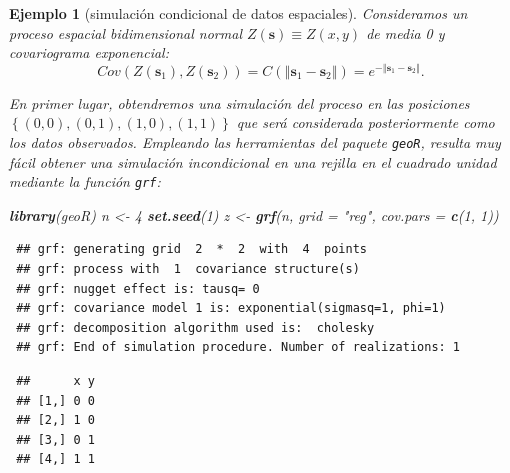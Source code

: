\documentclass[
  spanish,
  10pt,
]{book}
\newenvironment{Shaded}{\begin{snugshade}}{\end{snugshade}}
\newcommand{\AttributeTok}[1]{\textcolor[rgb]{0.13,0.29,0.53}{#1}}
\newcommand{\CommentTok}[1]{\textcolor[rgb]{0.56,0.35,0.01}{\textit{#1}}}
\newcommand{\DecValTok}[1]{\textcolor[rgb]{0.00,0.00,0.81}{#1}}
\newcommand{\FunctionTok}[1]{\textcolor[rgb]{0.13,0.29,0.53}{\textbf{#1}}}
\newcommand{\NormalTok}[1]{#1}
\newcommand{\OtherTok}[1]{\textcolor[rgb]{0.56,0.35,0.01}{#1}}
\newcommand{\SpecialCharTok}[1]{\textcolor[rgb]{0.81,0.36,0.00}{\textbf{#1}}}
\newcommand{\StringTok}[1]{\textcolor[rgb]{0.31,0.60,0.02}{#1}}
\renewcommand{\mathbf}[1]{\symbf{#1}}
\theoremstyle{break}
\newtheorem{example}{Ejemplo}[chapter]
\theoremstyle{nonumberplain}
\renewcommand{\CommentTok}[1]{\textcolor[rgb]{0.41,0.41,0.41}{\texttt{#1}}}
\begin{document}
\begin{example}[simulación condicional de datos espaciales]

Consideramos un proceso espacial bidimensional normal
\(Z(\mathbf{s})\equiv Z(x,y)\) de media 0 y covariograma
exponencial:
\[Cov(Z(\mathbf{s}_1),Z(\mathbf{s}_2)) 
= C(\left\Vert \mathbf{s}_1-\mathbf{s}_2\right\Vert )
= e^{-\left\Vert \mathbf{s}_1-\mathbf{s}_2\right\Vert }.\]

En primer lugar, obtendremos una simulación del proceso en las posiciones
\(\left\{(0,0),(0,1),(1,0),(1,1)\right\}\) que será considerada posteriormente
como los datos observados.
Empleando las herramientas del paquete \texttt{geoR}, resulta muy fácil obtener
una simulación incondicional en una rejilla en el cuadrado unidad
mediante la función \texttt{grf}:

\begin{Shaded}
\begin{Highlighting}[]
\FunctionTok{library}\NormalTok{(geoR)}
\NormalTok{n }\OtherTok{\textless{}{-}} \DecValTok{4}
\FunctionTok{set.seed}\NormalTok{(}\DecValTok{1}\NormalTok{)}
\NormalTok{z }\OtherTok{\textless{}{-}} \FunctionTok{grf}\NormalTok{(n, }\AttributeTok{grid =} \StringTok{"reg"}\NormalTok{, }\AttributeTok{cov.pars =} \FunctionTok{c}\NormalTok{(}\DecValTok{1}\NormalTok{, }\DecValTok{1}\NormalTok{))}
\end{Highlighting}
\end{Shaded}

\begin{verbatim}
 ## grf: generating grid  2  *  2  with  4  points
 ## grf: process with  1  covariance structure(s)
 ## grf: nugget effect is: tausq= 0 
 ## grf: covariance model 1 is: exponential(sigmasq=1, phi=1)
 ## grf: decomposition algorithm used is:  cholesky 
 ## grf: End of simulation procedure. Number of realizations: 1
\end{verbatim}

\begin{Shaded}
\end{Shaded}

\begin{verbatim}
 ##      x y
 ## [1,] 0 0
 ## [2,] 1 0
 ## [3,] 0 1
 ## [4,] 1 1
\end{verbatim}

\begin{Shaded}
\end{Shaded}


\end{example}
\end{document}
